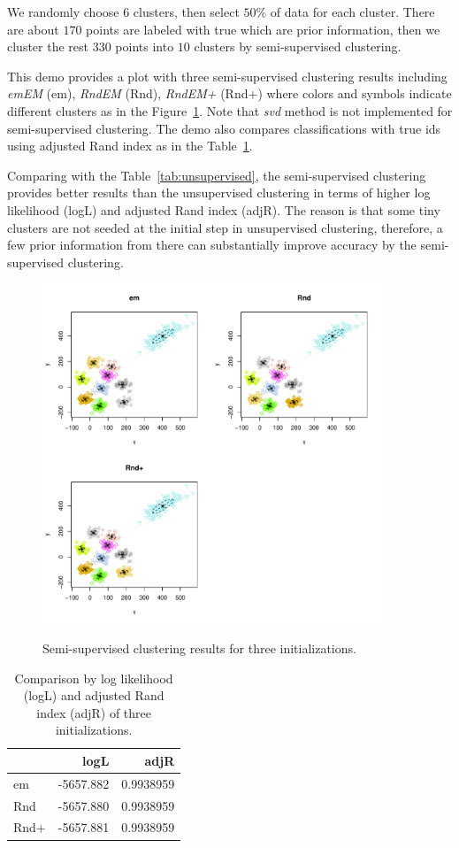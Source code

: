 We randomly choose $6$ clusters, then select $50\%$ of data for
each cluster. There are about $170$ points are labeled with true
which are prior information, then we cluster the rest $330$ points
into $10$ clusters by semi-supervised clustering.

This demo provides a plot
with three semi-supervised clustering results including
{\it emEM} (em), {\it RndEM} (Rnd), {\it RndEM+} (Rnd+) where
colors and symbols
indicate different clusters as in the Figure~\ref{fig:semi-supervised}.
Note that {\it svd} method is not implemented for semi-supervised clustering.
The demo also compares classifications with true ids using adjusted
Rand index as in the Table~\ref{tab:semi-supervised}.

Comparing with the Table~\ref{tab:unsupervised},
the semi-supervised clustering provides better results
than the unsupervised clustering in terms of
higher log likelihood (logL) and adjusted Rand index (adjR).
The reason is that some tiny clusters are not seeded at the initial step in
unsupervised clustering, therefore, a few prior information from there
can substantially improve accuracy by the semi-supervised clustering.


\begin{figure}[h]
\caption{Semi-supervised clustering results for three initializations.}
\centering
\includegraphics[width=4in]{./EMCluster-include/allinit_ss}
\label{fig:semi-supervised}
\end{figure}

\begin{table}[h]
\centering
\begin{tabular}{l|rr} \hline \hline
     &      logL &      adjR \\ \hline
em   & -5657.882 & 0.9938959 \\
Rnd  & -5657.880 & 0.9938959 \\
Rnd+ & -5657.881 & 0.9938959 \\ \hline \hline
\end{tabular}
\caption{Comparison by
log likelihood (logL) and adjusted Rand index (adjR) of three
initializations.}
\label{tab:semi-supervised}
\end{table}
